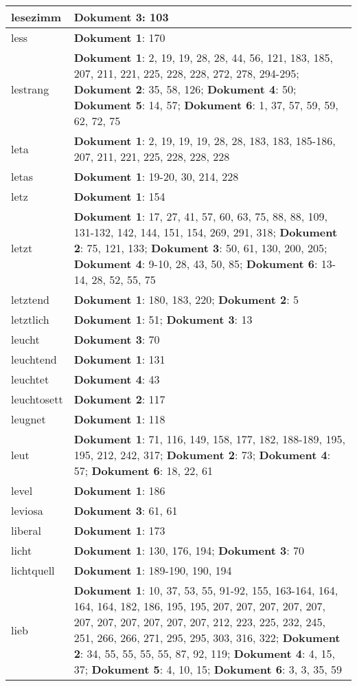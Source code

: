 \documentclass[a5paper]{article}
\begin{document}
\begin{longtable}[l]{|l|p{3in}|}
\hline
lesezimm & \textbf{Dokument 3}: 103 \\
\hline
less & \textbf{Dokument 1}: 170 \\
\hline
lestrang & \textbf{Dokument 1}: 2, 19, 19, 28, 28, 44, 56, 121, 183, 185, 207, 211, 221, 225, 228, 228, 272, 278, 294-295; \textbf{Dokument 2}: 35, 58, 126; \textbf{Dokument 4}: 50; \textbf{Dokument 5}: 14, 57; \textbf{Dokument 6}: 1, 37, 57, 59, 59, 62, 72, 75 \\
\hline
leta & \textbf{Dokument 1}: 2, 19, 19, 19, 28, 28, 183, 183, 185-186, 207, 211, 221, 225, 228, 228, 228 \\
\hline
letas & \textbf{Dokument 1}: 19-20, 30, 214, 228 \\
\hline
letz & \textbf{Dokument 1}: 154 \\
\hline
letzt & \textbf{Dokument 1}: 17, 27, 41, 57, 60, 63, 75, 88, 88, 109, 131-132, 142, 144, 151, 154, 269, 291, 318; \textbf{Dokument 2}: 75, 121, 133; \textbf{Dokument 3}: 50, 61, 130, 200, 205; \textbf{Dokument 4}: 9-10, 28, 43, 50, 85; \textbf{Dokument 6}: 13-14, 28, 52, 55, 75 \\
\hline
letztend & \textbf{Dokument 1}: 180, 183, 220; \textbf{Dokument 2}: 5 \\
\hline
letztlich & \textbf{Dokument 1}: 51; \textbf{Dokument 3}: 13 \\
\hline
leucht & \textbf{Dokument 3}: 70 \\
\hline
leuchtend & \textbf{Dokument 1}: 131 \\
\hline
leuchtet & \textbf{Dokument 4}: 43 \\
\hline
leuchtosett & \textbf{Dokument 2}: 117 \\
\hline
leugnet & \textbf{Dokument 1}: 118 \\
\hline
leut & \textbf{Dokument 1}: 71, 116, 149, 158, 177, 182, 188-189, 195, 195, 212, 242, 317; \textbf{Dokument 2}: 73; \textbf{Dokument 4}: 57; \textbf{Dokument 6}: 18, 22, 61 \\
\hline
level & \textbf{Dokument 1}: 186 \\
\hline
leviosa & \textbf{Dokument 3}: 61, 61 \\
\hline
liberal & \textbf{Dokument 1}: 173 \\
\hline
licht & \textbf{Dokument 1}: 130, 176, 194; \textbf{Dokument 3}: 70 \\
\hline
lichtquell & \textbf{Dokument 1}: 189-190, 190, 194 \\
\hline
lieb & \textbf{Dokument 1}: 10, 37, 53, 55, 91-92, 155, 163-164, 164, 164, 164, 182, 186, 195, 195, 207, 207, 207, 207, 207, 207, 207, 207, 207, 207, 207, 212, 223, 225, 232, 245, 251, 266, 266, 271, 295, 295, 303, 316, 322; \textbf{Dokument 2}: 34, 55, 55, 55, 55, 87, 92, 119; \textbf{Dokument 4}: 4, 15, 37; \textbf{Dokument 5}: 4, 10, 15; \textbf{Dokument 6}: 3, 3, 35, 59 \\

\end{longtable}
\end{document}
